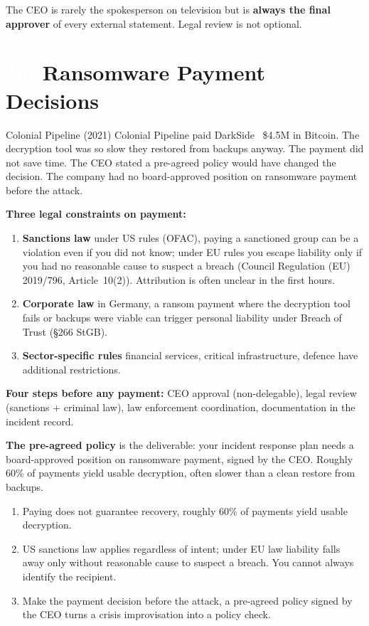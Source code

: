 \documentclass[11pt,a4paper,twoside]{book}
\newcommand{\lessontag}[1]{%
  \texorpdfstring{%
    \setlength{\fboxsep}{3pt}\colorbox{nisd2blue}{\textcolor{white}{\footnotesize\bfseries #1}}\quad%
  }{Lesson #1\ }%
}
\begin{document}
The CEO is rarely the spokesperson on television but is \textbf{always the final approver} of every external statement. Legal review is not optional.

\section{\lessontag{4.6}Ransomware Payment Decisions}

\begin{casestudy}{Colonial Pipeline (2021)}
Colonial Pipeline paid DarkSide ~\$4.5M in Bitcoin. The decryption tool was so slow they restored from backups anyway. The payment did not save time. The CEO stated a pre-agreed policy would have changed the decision. The company had no board-approved position on ransomware payment before the attack.
\end{casestudy}

\textbf{Three legal constraints on payment:}
\begin{enumerate}
  \item \textbf{Sanctions law} under US rules (OFAC), paying a sanctioned group can be a violation even if you did not know; under EU rules you escape liability only if you had no reasonable cause to suspect a breach (Council Regulation (EU) 2019/796, Article~10(2)). Attribution is often unclear in the first hours.
  \item \textbf{Corporate law} in Germany, a ransom payment where the decryption tool fails or backups were viable can trigger personal liability under Breach of Trust (§266 StGB).
  \item \textbf{Sector-specific rules} financial services, critical infrastructure, defence have additional restrictions.
\end{enumerate}

\textbf{Four steps before any payment:} CEO approval (non-delegable), legal review (sanctions + criminal law), law enforcement coordination, documentation in the incident record.

\textbf{The pre-agreed policy} is the deliverable: your incident response plan needs a board-approved position on ransomware payment, signed by the CEO. Roughly 60\% of payments yield usable decryption, often slower than a clean restore from backups.

\begin{keytakeaways}
\begin{enumerate}
  \item Paying does not guarantee recovery, roughly 60\% of payments yield usable decryption.
  \item US sanctions law applies regardless of intent; under EU law liability falls away only without reasonable cause to suspect a breach. You cannot always identify the recipient.
  \item Make the payment decision before the attack, a pre-agreed policy signed by the CEO turns a crisis improvisation into a policy check.
\end{enumerate}
\end{keytakeaways}
\end{document}
